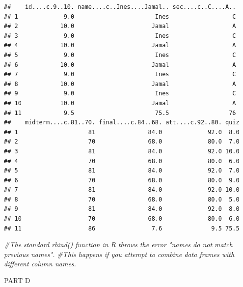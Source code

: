 \documentclass[
]{article}
\newenvironment{Shaded}{\begin{snugshade}}{\end{snugshade}}
\newcommand{\CommentTok}[1]{\textcolor[rgb]{0.56,0.35,0.01}{\textit{#1}}}
\newcommand{\NormalTok}[1]{#1}
\newcommand{\OtherTok}[1]{\textcolor[rgb]{0.56,0.35,0.01}{#1}}
\newcommand{\SpecialCharTok}[1]{\textcolor[rgb]{0.81,0.36,0.00}{\textbf{#1}}}
\newcommand{\StringTok}[1]{\textcolor[rgb]{0.31,0.60,0.02}{#1}}
\begin{document}
\begin{verbatim}
##    id....c.9..10. name....c..Ines....Jamal.. sec....c..C....A..
## 1             9.0                       Ines                  C
## 2            10.0                      Jamal                  A
## 3             9.0                       Ines                  C
## 4            10.0                      Jamal                  A
## 5             9.0                       Ines                  C
## 6            10.0                      Jamal                  A
## 7             9.0                       Ines                  C
## 8            10.0                      Jamal                  A
## 9             9.0                       Ines                  C
## 10           10.0                      Jamal                  A
## 11            9.5                       75.5                 76
##    midterm....c.81..70. final....c.84..68. att....c.92..80. quiz
## 1                    81               84.0             92.0  8.0
## 2                    70               68.0             80.0  7.0
## 3                    81               84.0             92.0 10.0
## 4                    70               68.0             80.0  6.0
## 5                    81               84.0             92.0  7.0
## 6                    70               68.0             80.0  9.0
## 7                    81               84.0             92.0 10.0
## 8                    70               68.0             80.0  5.0
## 9                    81               84.0             92.0  8.0
## 10                   70               68.0             80.0  6.0
## 11                   86                7.6              9.5 75.5
\end{verbatim}

\begin{Shaded}
\begin{Highlighting}[]
\CommentTok{\#The standard rbind() function in R throws the error "names do not match previous names".}
\CommentTok{\#This happens if you attempt to combine data frames with different column names.}
\end{Highlighting}
\end{Shaded}

PART D

\begin{Shaded}
\end{Shaded}
\end{document}
